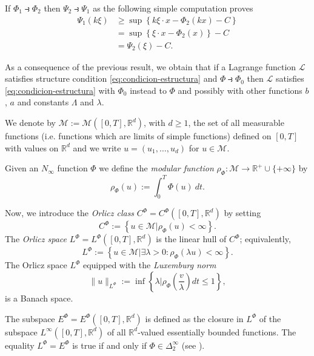 \documentclass[twoside]{article}
\theoremstyle{remark}
\newcommand{\orlnor}{\|_{L^{\Phi}}}
\newcommand{\lphi}{L^{\Phi}}
\newcommand{\ephi}{E^{\Phi}}
\newcommand{\claseor}{C^{\Phi}}
\newcommand{\rr}{\mathbb{R}}
\renewcommand{\leq}{\leqslant}
\renewcommand{\geq}{\geqslant}
\begin{document}
If $\Phi_1\strictif \Phi_2$ then $\Psi_2\strictif\Psi_1$ as the following simple computation proves 
\[
\begin{split}
  \Psi_1(k\xi)&\geq \sup \left\{k\xi\cdot x-\Phi_2(kx)-C\right\}\\
&=\sup \left\{\xi\cdot x-\Phi_2(x)\right\}-C\\
&=\Psi_2\left(\xi\right)-C.
\end{split}
\]





As a consequence of the previous result, we obtain that if a Lagrange function $\mathcal{L}$ satisfies structure condition \eqref{eq:condicion-estructura} and $\Phi\strictif \Phi_0$ then $\mathcal{L}$ satisfies \eqref{eq:condicion-estructura} with $\Phi_0$ instead to $\Phi$ and possibly with other functions $b$, $a$ and constants $\Lambda$ and $\lambda$.





 We denote by $\mathcal{M}:=\mathcal{M}\left([0,T],\rr^d\right)$, with $d\geq 1$,  the set of all measurable functions (i.e. functions which are limits of simple functions)  defined on $[0,T]$ with values on $\mathbb{R}^d$ and  we write $u=(u_1,\dots,u_d)$ for  $u\in \mathcal{M}$.

 Given  an $N_{\infty}$ function $\Phi$ we define the \emph{modular function} 
$\rho_{\Phi}:\mathcal{M}\to \mathbb{R}^+\cup\{+\infty\}$ by
\[\rho_{\Phi}(u):= \int_0^T \Phi(u)\ dt.\]

Now, we introduce the \emph{Orlicz class} $C^{\Phi}=C^{\Phi}\left([0,T],\rr^d\right)$   by setting
\begin{equation}\label{claseOrlicz}
  C^{\Phi}:=\left\{u\in \mathcal{M} | \rho_{\Phi}(u)< \infty \right\}.
\end{equation}
The \emph{Orlicz space} $\lphi=L^{\Phi}\left([0,T],\rr^d\right)$ is the linear hull of $\claseor$;
equivalently,
\begin{equation}\label{espacioOrlicz}
\lphi:=\left\{ u\in \mathcal{M}| \exists \lambda>0: \rho_{\Phi}(\lambda u) < \infty   \right\}.
\end{equation}
  The Orlicz space $\lphi$ equipped with the \emph{Luxemburg norm}
\[
\|  u  \orlnor:=\inf \left\{ \lambda\bigg| \rho_{\Phi}\left(\frac{v}{\lambda}\right) dt\leq 1\right\},
\]
is a Banach space. 


The subspace $\ephi=\ephi\left([0,T],\rr^d\right)$ is defined as the closure in $\lphi$ of the subspace $L^{\infty}\left([0,T],\rr^d\right)$ of all $\mathbb{R}^d$-valued essentially bounded functions. The equality $\lphi=\ephi$ is true if and only if $\Phi\in\Delta_2^{\infty}$ (see \cite[Cor. 5.1]{Orliczvectorial2005}). 
\end{document}
